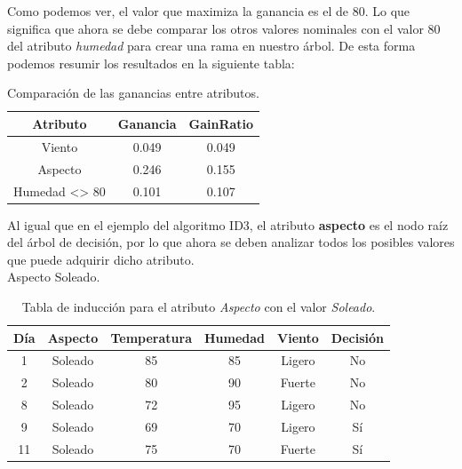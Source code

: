 \begin{UClist}
	\UCli Como podemos ver, el valor que maximiza la ganancia es el de 80. Lo que significa que ahora se debe comparar los otros valores nominales con el valor 80 del atributo \emph{humedad} para crear una rama en nuestro árbol. De esta forma podemos resumir los resultados en la siguiente tabla:\\

	\begin{table}[H]
		\label{tab:tablaComparacionHumedadAtributos}
		\begin{center}
			\begin{tabular}{c|c|c}
				\textbf{Atributo} & \textbf{Ganancia} & \textbf{GainRatio}\\
				\hline
				Viento & 0.049 & 0.049\\
				Aspecto & 0.246 & 0.155\\
				Humedad <> 80 & 0.101 & 0.107\\
			\end{tabular}
			\caption{Comparación de las ganancias entre atributos.}
		\end{center}
	\end{table} 

	\UCli Al igual que en el ejemplo del algoritmo ID3, el atributo \textbf{aspecto} es el nodo raíz del árbol de decisión, por lo que ahora se deben analizar todos los posibles valores que puede adquirir dicho atributo.\\

	\UCli Aspecto Soleado.\\

	\begin{table}[H]
		\begin{center}
			\label{tab:tablaSoleadoC4.5}
			\begin{tabular}{c|c|c|c|c|c}
				\textbf{Día} & \textbf{Aspecto} & \textbf{Temperatura} & \textbf{Humedad} & \textbf{Viento} & \textbf{Decisión}\\
				\hline
				1 & Soleado & 85 & 85 & Ligero & No\\
				2 & Soleado & 80 & 90 & Fuerte & No\\
				8 & Soleado & 72 & 95 & Ligero & No\\
				9 & Soleado & 69 & 70 & Ligero & Sí\\
				11 & Soleado & 75 & 70 & Fuerte & Sí\\
			\end{tabular}
		\end{center}
		\caption{Tabla de inducción para el atributo \emph{Aspecto} con el valor \emph{Soleado}.}
	\end{table}


\end{UClist}
